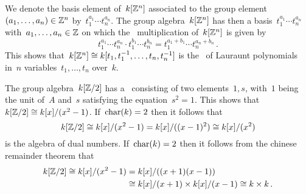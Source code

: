 We denote the basis element of~$k[\mathbb{Z}^n]$ associated to the group element~$(a_1, \dotsc, a_n) \in \mathbb{Z}^n$ by~$t_1^{a_1} \dotsm t_n^{a_n}$.
The group algebra~$k[\mathbb{Z}^n]$ has then a basis~$t_1^{a_1} \dotsm t_n^{a_n}$ with~$a_1, \dotsc, a_n \in \mathbb{Z}$ on which the~{\kbil} multiplication of~$k[\mathbb{Z}^n]$ is given by
\[
        t_1^{a_1} \dotsm t_n^{a_n}
  \cdot t_1^{b_1} \dotsm t_n^{b_n}
  =     t_1^{a_1 + b_1} \dotsm t_n^{a_n + b_n} \,.
\]
This shows that~$k[\mathbb{Z}^n] \cong k[t_1, t_1^{-1}, \dotsc, t_n, t_n^{-1}]$ is the~{\kalg} of Lauraunt polynomials in~$n$ variables~$t_1, \dotsc, t_n$ over~$k$.

The group algebra~$k[\mathbb{Z}/2]$ has a~{\kbasis} consisting of two elements~$1, s$, with~$1$ being the unit of~$A$ and~$s$ satisfying the equation~$s^2 = 1$.
This shows that~$k[\mathbb{Z}/2] \cong k[x]/(x^2 - 1)$.
If~$\operatorname{char}(k) = 2$ then it follows that
\[
        k[\mathbb{Z}/2]
  \cong k[x]/(x^2 - 1)
  =     k[x]/((x-1)^2)
  \cong k[x]/(x^2)
\]
is the algebra of dual numbers.
If~$\operatorname{char}(k) = 2$ then it follows from the chinese remainder theorem that
\begin{align*}
          k[\mathbb{Z}/2]
   \cong  k[x]/(x^2 - 1)
  &=      k[x]/((x+1)(x-1)) \\
  &\cong  k[x]/(x+1) \times k[x]/(x-1)
   \cong  k \times k \,.
\end{align*}


